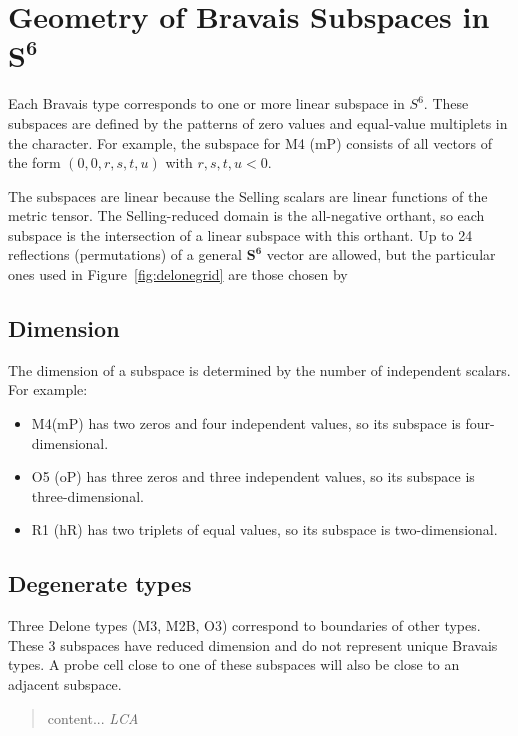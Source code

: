 \documentclass[preprint]{iucr}              %
\newcommand{\SVI}[0]{$\mathbf{S^{6}}$}
\begin{document}
	\section{Geometry of Bravais Subspaces in \SVI{}}
	
	Each Bravais type corresponds to one or more linear subspace in $S^6$. These
	subspaces are defined by the patterns of zero values and equal-value multiplets in the
	character. For example, the subspace for M4 (mP) consists of all vectors of the form
	\((0,0,r,s,t,u)\) with $r,s,t,u < 0$.
	
	The subspaces are linear because the Selling scalars are linear functions of the
	metric tensor. The Selling-reduced domain is the all-negative orthant, so each
	subspace is the intersection of a linear subspace with this orthant.
	Up to 24 reflections (permutations) of a general \SVI{} vector are allowed,
	but the particular ones used in Figure~\ref{fig:delonegrid} are those chosen by 
	
	\subsection{Dimension}
	
	The dimension of a subspace is determined by the number of independent scalars.
	For example:
	\begin{itemize}
		\item M4(mP) has two zeros and four independent values, so its subspace is
		four-dimensional.
		\item O5 (oP) has three zeros and three independent values, so its subspace is
		three-dimensional.
		\item R1 (hR) has two triplets of equal values, so its subspace is two-dimensional.
	\end{itemize}
	
	\subsection{Degenerate types}
	
	Three Delone types (M3, M2B, O3) correspond to boundaries of other types.
	These 3 subspaces have reduced dimension and do not represent unique Bravais
	types. A probe cell close to one of these subspaces will also be close to an adjacent subspace.
	
	\begin{quote}
		content...  \emph{LCA}
	\end{quote}
	
\end{document}
